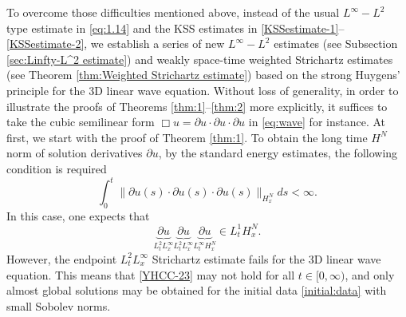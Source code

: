 \documentclass[11pt,twoside]{article}
\theoremstyle{plain}
\theoremstyle{definition}
\numberwithin{equation}{section}
\begin{document}
To overcome those difficulties mentioned above, instead of the usual $L^\infty-L^2$ type estimate in \eqref{eq:1.14} and the KSS estimates in \eqref{KSSestimate-1}--\eqref{KSSestimate-2}, we establish a series of new $L^\infty-L^2$ estimates (see Subsection \ref{sec:Linfty-L^2 estimate})
and weakly space-time weighted Strichartz estimates (see Theorem \ref{thm:Weighted Strichartz estimate})
based on the strong Huygens' principle for the 3D linear wave equation.
Without loss of generality, in order to illustrate the proofs of Theorems \ref{thm:1}--\ref{thm:2} more explicitly, it suffices to
take the cubic semilinear form $\Box u = \partial u \cdot \partial u \cdot \partial u $ in \eqref{eq:wave} for instance.
At first, we start with the proof of Theorem \ref{thm:1}. To obtain the long time $H^N$ norm
of solution derivatives $\partial u$, by the standard energy estimates, the following condition is required
\begin{equation}\label{YHCC-22}
	\int_0^t \|\partial u(s)\cdot \partial u(s)\cdot \partial u (s)\|_{H_x^N} ds<\infty.
\end{equation}
In this case, one expects that
\begin{equation}\label{YHCC-23}
	\underbrace{\partial u}_{L_t^2L_x^{\infty}}\underbrace{\partial u}_{L_t^2L_x^{\infty}}
	\underbrace{\partial u}_{L_t^\infty H_x^N}\in  L_t^1H_x^N.
\end{equation}
However, the endpoint $L^2_t L^\infty_x$ Strichartz estimate fails for the 3D linear wave equation. This means that \eqref{YHCC-23} may not hold for all $t\in [0,\infty)$, and only almost global solutions may be obtained for the  initial data \eqref{initial:data}
with small Sobolev norms.
\end{document}
